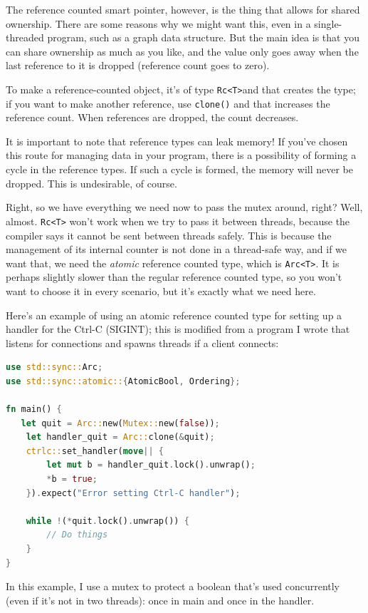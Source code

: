 \documentclass[a4paper]{report}
\begin{document}
The reference counted smart pointer, however, is the thing that allows for shared ownership. There are some reasons why we might want this, even in a single-threaded program, such as a graph data structure. But the main idea is that you can share ownership as much as you like, and the value only goes away when the last reference to it is dropped (reference count goes to zero). 

To make a reference-counted object, it's of type \texttt{Rc<T>}and that creates the type; if you want to make another reference, use \texttt{clone()} and that increases the reference count. When references are dropped, the count decreases.

It is important to note that reference types can leak memory! If you've chosen this route for managing data in your program, there is a possibility of forming a cycle in the reference types. If such a cycle is formed, the memory will never be dropped. This is undesirable, of course.

Right, so we have everything we need now to pass the mutex around, right? Well, almost. \texttt{Rc<T>} won't work when we try to pass it between threads, because the compiler says it cannot be sent between threads safely. This is because the management of its internal counter is not done in a thread-safe way, and if we want that, we need the \textit{atomic} reference counted type, which is \texttt{Arc<T>}. It is perhaps slightly slower than the regular reference counted type, so you won't want to choose it in every scenario, but it's exactly what we need here.

Here's an example of using an atomic reference counted type for setting up a handler for the Ctrl-C (SIGINT); this is modified from a program I wrote that listens for connections and spawns threads if a client connects: 

\begin{lstlisting}[language=Rust]
use std::sync::Arc;
use std::sync::atomic::{AtomicBool, Ordering};

fn main() {
   let quit = Arc::new(Mutex::new(false));
    let handler_quit = Arc::clone(&quit);
    ctrlc::set_handler(move|| {
        let mut b = handler_quit.lock().unwrap();
        *b = true;
    }).expect("Error setting Ctrl-C handler");
 
    while !(*quit.lock().unwrap()) {
    	// Do things
    }
}
\end{lstlisting}

In this example, I use a mutex to protect a boolean that's used concurrently (even if it's not in two threads): once in main and once in the handler. 
\end{document}
